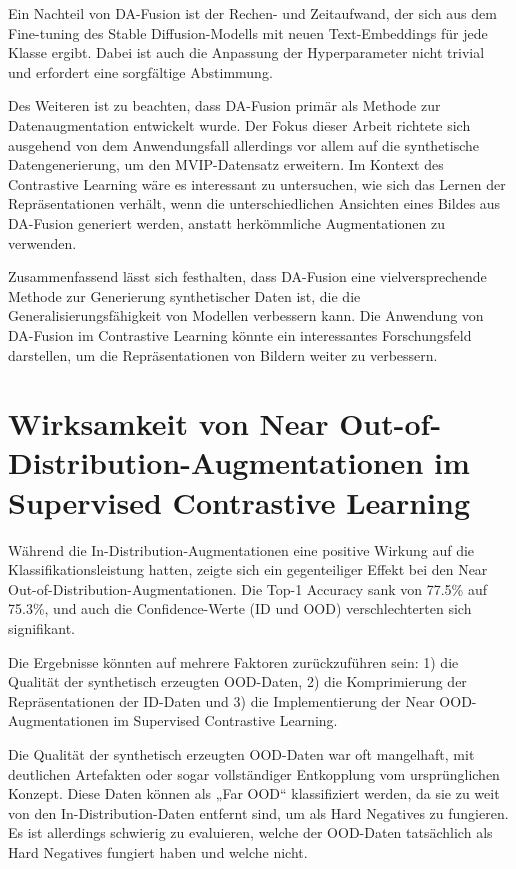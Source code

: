 Ein Nachteil von DA-Fusion ist der Rechen- und Zeitaufwand, der sich aus dem Fine-tuning des Stable Diffusion-Modells mit neuen Text-Embeddings für jede Klasse ergibt. Dabei ist auch die Anpassung der Hyperparameter nicht trivial und erfordert eine sorgfältige Abstimmung.

Des Weiteren ist zu beachten, dass DA-Fusion primär als Methode zur Datenaugmentation entwickelt wurde. Der Fokus dieser Arbeit richtete sich ausgehend von dem Anwendungsfall allerdings vor allem auf die synthetische Datengenerierung, um den MVIP-Datensatz erweitern. Im Kontext des Contrastive Learning wäre es interessant zu untersuchen, wie sich das Lernen der Repräsentationen verhält, wenn die unterschiedlichen Ansichten eines Bildes aus DA-Fusion generiert werden, anstatt herkömmliche Augmentationen zu verwenden.

Zusammenfassend lässt sich festhalten, dass DA-Fusion eine vielversprechende Methode zur Generierung synthetischer Daten ist, die die Generalisierungsfähigkeit von Modellen verbessern kann. Die Anwendung von DA-Fusion im Contrastive Learning könnte ein interessantes Forschungsfeld darstellen, um die Repräsentationen von Bildern weiter zu verbessern.

\section{Wirksamkeit von Near Out-of-Distribution-Augmentationen im Supervised Contrastive Learning} \label{sec:ood-discussion}

Während die In-Distribution-Augmentationen eine positive Wirkung auf die Klassifikationsleistung hatten, zeigte sich ein gegenteiliger Effekt bei den Near Out-of-Distribution-Augmentationen. Die Top-1 Accuracy sank von 77.5\% auf 75.3\%, und auch die Confidence-Werte (ID und OOD) verschlechterten sich signifikant. 

Die Ergebnisse könnten auf mehrere Faktoren zurückzuführen sein: 1) die Qualität der synthetisch erzeugten OOD-Daten, 2) die Komprimierung der Repräsentationen der ID-Daten und 3) die Implementierung der Near OOD-Augmentationen im Supervised Contrastive Learning.

Die Qualität der synthetisch erzeugten OOD-Daten war oft mangelhaft, mit deutlichen Artefakten oder sogar vollständiger Entkopplung vom ursprünglichen Konzept. Diese Daten können als „Far OOD“ klassifiziert werden, da sie zu weit von den In-Distribution-Daten entfernt sind, um als Hard Negatives zu fungieren. Es ist allerdings schwierig zu evaluieren, welche der OOD-Daten tatsächlich als Hard Negatives fungiert haben und welche nicht.

